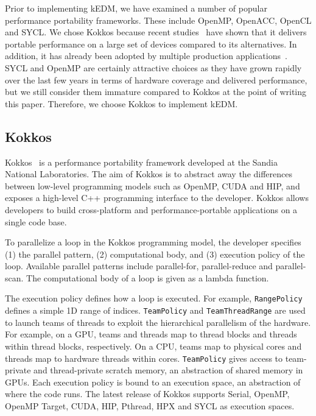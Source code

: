 \documentclass[sigconf]{acmart}
\begin{document}
Prior to implementing kEDM, we have examined a number of popular performance
portability frameworks. These include OpenMP, OpenACC, OpenCL and SYCL\@. We
chose Kokkos  because recent studies~\cite{Martineau2017, Deakin2019, Deakin2020}
have shown that it delivers portable performance on a large set of devices
compared to its alternatives. In addition, it has already been adopted by
multiple production applications~\cite{Sprague2020,Holmen2017,Demeshko2019}.
SYCL and OpenMP are certainly attractive choices as they have grown rapidly over the
last few years in terms of hardware coverage and delivered performance, but we
still consider them immature compared to Kokkos at the point of writing this
paper. Therefore, we choose Kokkos to implement kEDM\@.

\subsection{Kokkos}

Kokkos~\cite{Edwards2014} is a performance portability framework developed at
the Sandia National Laboratories. The aim of Kokkos is to abstract away the
differences between low-level programming models such as OpenMP, CUDA and HIP,
and exposes a high-level C++ programming interface to the developer. Kokkos allows
developers to build cross-platform and performance-portable applications on a
single code base.

To parallelize a loop in the Kokkos programming model, the developer specifies (1)
the parallel pattern, (2) computational body, and (3) execution policy of the
loop. Available parallel patterns include parallel-for, parallel-reduce and
parallel-scan. The computational body of a loop is given as a lambda function.

The execution policy defines how a loop is executed. For example,
\texttt{RangePolicy} defines a simple 1D range of indices. \texttt{TeamPolicy}
and \texttt{TeamThreadRange} are used to launch teams of threads to exploit
the hierarchical parallelism of the hardware. For example, on a GPU, teams and threads map
to thread blocks and threads within thread blocks, respectively. On a CPU,
teams map to physical cores and threads map to hardware threads within cores.
\texttt{TeamPolicy} gives access to team-private and thread-private scratch
memory, an abstraction of shared memory in GPUs. Each execution policy is
bound to an execution space, an abstraction of where the code runs. The latest
release of Kokkos supports Serial, OpenMP, OpenMP Target, CUDA, HIP, Pthread,
HPX and SYCL as execution spaces.
\end{document}
